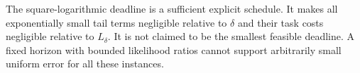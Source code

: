 \begin{remark}
The square-logarithmic deadline is a sufficient explicit schedule. It makes
all exponentially small tail terms negligible relative to $\delta$ and
their task costs negligible relative to $L_\delta$. It is not claimed to be
the smallest feasible deadline. A fixed horizon with bounded likelihood ratios
cannot support arbitrarily small uniform error for all these instances.
\end{remark}

